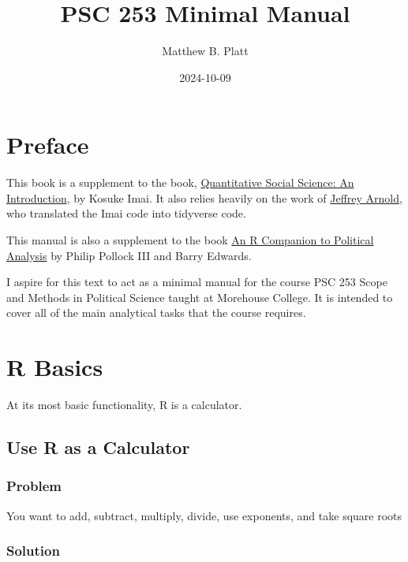 \documentclass[
]{book}
\title{PSC 253 Minimal Manual}
\author{Matthew B. Platt}
\date{2024-10-09}
\begin{document}
\maketitle

{
\setcounter{tocdepth}{1}
\tableofcontents
}
\hypertarget{preface}{%
\chapter*{Preface}\label{preface}}

This book is a supplement to the book, \href{http://qss.princeton.press/}{Quantitative Social Science: An Introduction}, by Kosuke Imai. It also relies heavily on the work of \href{https://jrnold.github.io/qss-tidy/}{Jeffrey Arnold}, who translated the Imai code into tidyverse code.

This manual is also a supplement to the book \href{https://us.sagepub.com/en-us/nam/an-r-companion-to-political-analysis/book244716}{An R Companion to Political Analysis} by Philip Pollock III and Barry Edwards.

I aspire for this text to act as a minimal manual for the course PSC 253 Scope and Methods in Political Science taught at Morehouse College. It is intended to cover all of the main analytical tasks that the course requires.

\hypertarget{basic}{%
\chapter{R Basics}\label{basic}}

At its most basic functionality, R is a calculator.

\hypertarget{calculate}{%
\section{Use R as a Calculator}\label{calculate}}

\hypertarget{problem}{%
\subsection{Problem}\label{problem}}

You want to add, subtract, multiply, divide, use exponents, and take square roots

\hypertarget{solution}{%
\subsection{Solution}\label{solution}}
\end{document}

